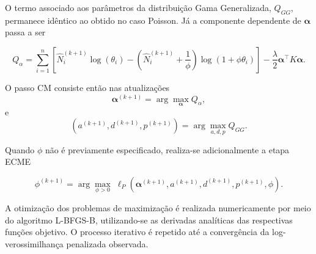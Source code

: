 O termo associado aos parâmetros da distribuição Gama Generalizada, \(Q_{GG}\), permanece idêntico ao
obtido no caso Poisson. Já a componente dependente de \(\boldsymbol{\alpha}\) passa a ser

\begin{equation}
Q_{\alpha}
=
\sum_{i=1}^{n}
\left[
\widehat N_i^{(k+1)}
\log(\theta_i)
-
\left(
\widehat N_i^{(k+1)}
+
\frac{1}{\phi}
\right)
\log(1+\phi\theta_i)
\right]
-
\frac{\lambda}{2}
\boldsymbol{\alpha}^{\top}
K
\boldsymbol{\alpha}.
\end{equation}

O passo CM consiste então nas atualizações
\begin{equation}
\boldsymbol{\alpha}^{(k+1)}
=
\arg\max_{\boldsymbol{\alpha}}
Q_{\alpha},
\end{equation}
e
\begin{equation}
(a^{(k+1)},d^{(k+1)},p^{(k+1)})
=
\arg\max_{a,d,p}
Q_{GG}.
\end{equation}

Quando \(\phi\) não é previamente especificado, realiza-se adicionalmente a etapa ECME

\begin{equation}
\phi^{(k+1)}
=
\arg\max_{\phi>0}
\;
\ell_P
\!\left(
\boldsymbol{\alpha}^{(k+1)},
a^{(k+1)},
d^{(k+1)},
p^{(k+1)},
\phi
\right).
\end{equation}

A otimização dos problemas de maximização é realizada numericamente por meio do algoritmo L-BFGS-B,
utilizando-se as derivadas analíticas das respectivas funções objetivo. O processo iterativo é repetido
até a convergência da log-verossimilhança penalizada observada.


